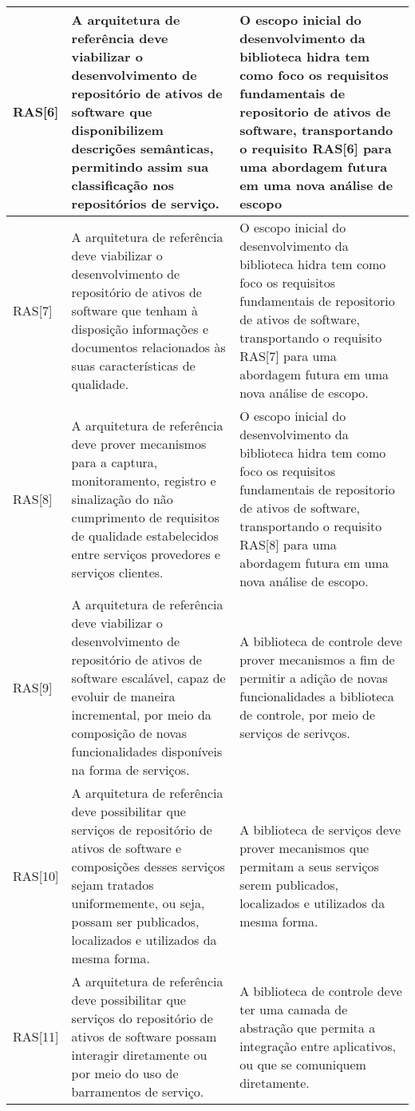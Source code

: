 \begin{longtable}{ | l | p{7cm} | p{7cm} |}
 \\ \hline
RAS[6] & 
A arquitetura de referência deve viabilizar o desenvolvimento  de repositório de ativos de software que disponibilizem  descrições semânticas, permitindo assim sua classificação nos  repositórios de serviço. & O escopo inicial do desenvolvimento da biblioteca hidra tem como foco os requisitos fundamentais de repositorio de ativos de software, transportando o requisito RAS[6] para uma abordagem futura em uma nova análise de escopo
\\ \hline
RAS[7] & 
A arquitetura de referência deve viabilizar o desenvolvimento  de repositório de ativos de software que tenham à disposição  informações e documentos relacionados às suas características  de qualidade. & O escopo inicial do desenvolvimento da biblioteca hidra tem como foco os requisitos fundamentais de repositorio de ativos de software, transportando o requisito RAS[7] para uma abordagem futura em uma nova análise de escopo.
 \\ \hline 

RAS[8] & 
A arquitetura de referência deve prover mecanismos para a  captura, monitoramento, registro e sinalização do não  cumprimento de requisitos de qualidade estabelecidos entre  serviços provedores e serviços clientes. & O escopo inicial do desenvolvimento da biblioteca hidra tem como foco os requisitos fundamentais de repositorio de ativos de software, transportando o requisito RAS[8] para uma abordagem futura em uma nova análise de escopo.
 \\ \hline 

RAS[9] & 
A arquitetura de referência deve viabilizar o desenvolvimento
de repositório de ativos de software escalável, capaz de evoluir 
de maneira incremental, por meio da composição de novas 
funcionalidades disponíveis na forma de serviços. & A biblioteca de controle deve prover mecanismos a fim de permitir a adição de novas funcionalidades a biblioteca de controle, por meio de serviços de serivços.
 \\ \hline 
 RAS[10] & 
A arquitetura de referência deve possibilitar que serviços de  repositório de ativos de software e composições desses  serviços sejam tratados uniformemente, ou seja, possam ser  publicados, localizados e utilizados da mesma forma. & A biblioteca de serviços deve prover mecanismos que permitam a seus serviços serem publicados, localizados e utilizados da mesma forma.
 \\ \hline 
 
 RAS[11] & 

A arquitetura de referência deve possibilitar que serviços do  repositório de ativos de software possam interagir diretamente  ou por meio do uso de barramentos de serviço. & 
A biblioteca de controle deve ter uma camada de abstração que permita a integração entre aplicativos, ou que se comuniquem diretamente.

 \\ \hline 

\end{longtable}

